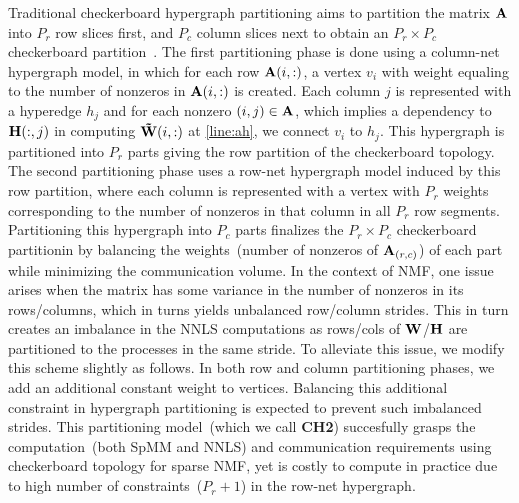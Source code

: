 Traditional checkerboard hypergraph partitioning aims to partition the matrix $\mathbf{A}$ into $P_r$ row slices first, and $P_c$ column slices next to obtain an $P_r \times P_c$ checkerboard partition~\cite{caay:99,aycu:08}.
The first partitioning phase is done using a column-net hypergraph model, in which for each row $\mathbf{A}(i, :)$, a vertex $v_i$ with weight equaling to the number of nonzeros in $\mathbf{A}(i, :)$ is created.
Each column $j$ is represented with a hyperedge $h_j$ and for each nonzero $(i, j) \in \mathbf{A}$, which implies a dependency to $\mathbf{H}(:, j)$ in computing $\mathbf{\tilde{W}}(i, :)$ at \cref{line:ah}, we connect $v_i$ to $h_j$.
This hypergraph is partitioned into $P_r$ parts giving the row partition of the checkerboard topology.
The second partitioning phase uses a row-net hypergraph model induced by this row partition, where each column is represented with a vertex with $P_r$ weights corresponding to the number of nonzeros in that column in all $P_r$ row segments.
Partitioning this hypergraph into $P_c$ parts finalizes the $P_r \times P_c$ checkerboard partitionin by balancing the weights~(number of nonzeros of $\mathbf{A}_{(r, c)}$) of each part while minimizing the communication volume.
In the context of NMF, one issue arises when the matrix has some variance in the number of nonzeros in its rows/columns, which in turns yields unbalanced row/column strides.
This in turn creates an imbalance in the NNLS computations as rows/cols of $\mathbf{W}$/$\mathbf{H}$ are partitioned to the processes in the same stride.
To alleviate this issue, we modify this scheme slightly as follows.
In both row and column partitioning phases, we add an additional constant weight to vertices.
Balancing this additional constraint in hypergraph partitioning is expected to prevent such imbalanced strides.
This partitioning model~(which we call \textbf{CH2}) succesfully grasps the computation~(both SpMM and NNLS) and communication requirements using checkerboard topology for sparse NMF, yet is costly to compute in practice due to high number of constraints~($P_r + 1$) in the row-net hypergraph.

